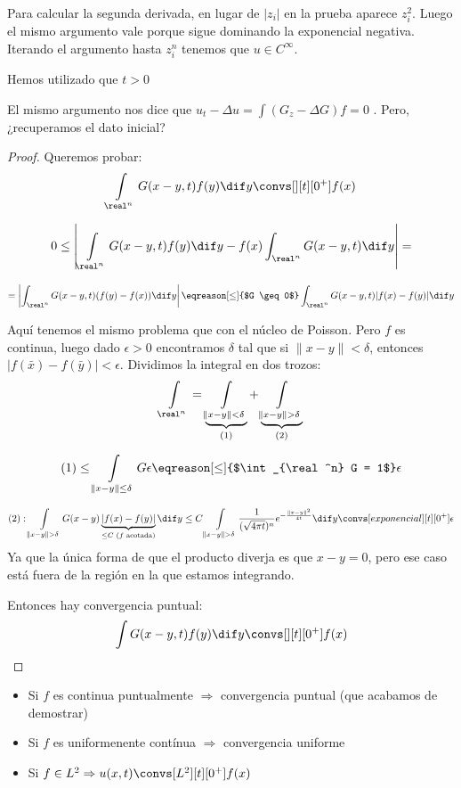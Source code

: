 		Para calcular la segunda derivada, en lugar de $|z_i|$ en la prueba aparece $z_i^2$. Luego el mismo argumento vale porque sigue dominando la exponencial negativa. Iterando el argumento hasta $z_i^n$ tenemos que $u \in C^\infty$.

		\obs Hemos utilizado que $t>0$

		El mismo argumento nos dice que $u_t - \Delta u = \int (G_z - \Delta G) f = 0$ . Pero, ¿recuperamos el dato inicial?

		\begin{proof}

			Queremos probar:
			\[ \int\limits_{\real^n} G(x-y,t) f(y) \dif y \convs[][t][0^+] f(x)\]

			\[ 0 \leq \left| \int\limits_{\real^n} G(x-y,t) f(y) \dif y - f(x) \int_{\real^n} G(x-y,t) \dif y \right| = \]

			\[ = \left| \int_{\real^n} G(x-y,t) (f(y)-f(x))\dif y \right| \eqreason[\leq]{$G \geq 0$} \int_{\real^n} G(x-y,t) |f(x) - f(y)| \dif y \]

			Aquí tenemos el mismo problema que con el núcleo de Poisson. Pero $f$ es continua, luego dado $\epsilon > 0$ encontramos $\delta$ tal que si $\|x-y\| < \delta$, entonces $|f(\bar{x})-f(\bar{y})| < \epsilon$. Dividimos la integral en dos trozos:
			\[ \int\limits_{\real^n} = \underbrace{\int\limits_{\|x-y\| < \delta}}_{(1)} + \underbrace{\int\limits_{\|x-y\|>\delta}}_{(2)}\]

			\[ (1) \leq \int\limits_{\|x-y\|\leq \delta} G \epsilon \eqreason[\leq]{$\int_{\real^n} G = 1$} \epsilon\]

			\[ (2): \int\limits_{\|x-y\|>\delta} G(x-y) \underbrace{| f(x) - f(y) |}_{\leq C \text{ ($f$ acotada)}} \dif y \leq C \int\limits_{\|x-y\| > \delta} \frac{1}{(\sqrt{4\pi t})^n} e^{-\frac{\|x-y\|^2}{4t}} \dif y \convs[exponencial][t][0^+] \epsilon\]
			Ya que la única forma de que el producto diverja es que $x-y=0$, pero ese caso está fuera de la región en la que estamos integrando.

			Entonces hay convergencia puntual:
			\[\int G(x-y,t) f(y) \dif y \convs[][t][0^+] f(x)\]

		\end{proof}

		\obs
				\begin{itemize}
					\item Si $f$ es continua puntualmente $\Rightarrow$ convergencia puntual (que acabamos de demostrar)
					\item Si $f$ es uniformenente contínua $\Rightarrow$ convergencia uniforme
					\item Si $f \in L^2 \Rightarrow u(x,t) \convs[L^2][t][0^+] f(x)$
				\end{itemize}


